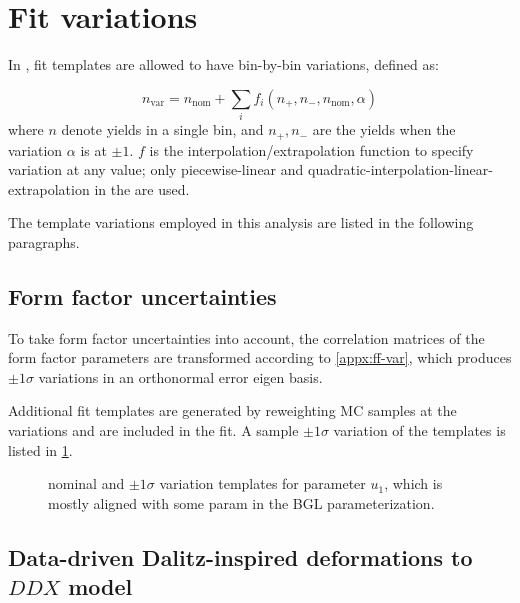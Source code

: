 \section{Fit variations}
\label{ref:fit:var}

In \HistFactory, fit templates are allowed to have bin-by-bin variations,
defined as:

\begin{equation}
    n_\text{var} = n_\text{nom} + \sum_i f_i(n_+, n_-, n_\text{nom}, \alpha)
\end{equation}
where $n$ denote yields in a single bin, and
$n_+, n_-$ are the yields when the variation $\alpha$ is at $\pm 1$.
$f$ is the interpolation/extrapolation function to specify variation
at any value; only
piecewise-linear and quadratic-interpolation-linear-extrapolation
in the \HistFactory are used.

The template variations employed in this analysis are listed in the following
paragraphs.

\subsection{Form factor uncertainties}

To take form factor uncertainties into account, the correlation
matrices of the form factor parameters are transformed
according to \cref{appx:ff-var}, which produces $\pm 1\sigma$ variations
in an orthonormal error eigen basis.

Additional fit templates are generated by reweighting MC samples at the
variations and are included in the fit.
A sample $\pm 1\sigma$ variation of the \Dz\mun templates is listed in
\cref{fig:fit-variations:ff}.

\begin{figure}[htb]

    \caption{
        \Dz\mun nominal and $\pm 1\sigma$ variation templates for
        parameter $u_1$, which is mostly aligned with
        some param in the BGL parameterization.
    }
    \label{fig:fit-variations:ff}
\end{figure}


\subsection{Data-driven Dalitz-inspired deformations to $DDX$ model}
\label{sec:fit-to-data:fit-tmpl-vars:ddx}

